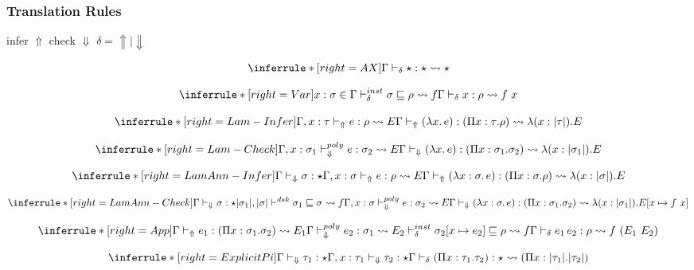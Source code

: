 \gram{\ottE\ottinterrule}

\subsubsection{Translation Rules}

 infer $\Uparrow$ check $\Downarrow$ $\delta = \Uparrow \mid \Downarrow$

\[
\inferrule*[right=AX]
{} {\infercheck \star : \star \transto{\star}}
\]

\[
\inferrule*[right=Var]
{x:\sigma \in \Gamma \\ \instinfercheck \sigma \sqsubseteq \rho \transto{f} } {\infercheck x : \rho \transto{f\ x}}
\]

\[
\inferrule*[right=Lam-Infer]
{\Gamma,x: \tau \infertypeno e : \rho \transto{E} }
{\infertype (\lambda x.\, e) : (\Pi x: \tau. \rho) \transto {\lambda(x:\translated{\tau}). E}}
\]

\[
\inferrule*[right=Lam-Check]
{\Gamma,x: \sigma_1 \polycheckno e : \sigma_2 \transto{E}
} {\checktype (\lambda x.\, e) : (\Pi x: \sigma_1. \sigma_2) \transto{\lambda(x:\translated{\sigma_1}).E}}
\]

\[
\inferrule*[right=LamAnn-Infer]
{
\checktype \sigma:\star \\
\Gamma,x: \sigma \infertypeno e : \rho \transto{E}
} {\infertype (\lambda x:\sigma.\, e) : (\Pi x: \sigma. \rho) \transto{\lambda(x:\translated{\sigma}). E}}
\]

\[
\inferrule*[right=LamAnn-Check]
{
\checktype \sigma:\star \\
\translated{\sigma_1}, \translated{\sigma} \polymorphic \sigma_1 \sqsubseteq \sigma \transto{f} \\
\Gamma,x: \sigma \polycheckno e : \sigma_2 \transto{E} \\
}
{\checktype (\lambda x:\sigma.\, e) : (\Pi x: \sigma_1. \sigma_2) \transto{ \lambda(x:\translated{\sigma_1}). E[\tpmapsto \sigma x {f\ x}] }}
\]

\[
\inferrule*[right=App]
{\infertype e_1 : (\Pi x:\sigma_1. \sigma_2) \transto {E_1} \\
\polycheck e_2 : \sigma_1 \transto{E_2}\\
\instinfercheck \sigma_2 [\tpmapsto {\sigma_1} x e_2] \sqsubseteq \rho \transto{f}}
{\infercheck e_1\,e_2 : \rho \transto{f\ (E_1\ E_2)}}
\]

\[
\inferrule*[right=ExplicitPi]
{\checktype \tau_1 : \star \\ \Gamma, x:\tau_1 \checktypeno \tau_2 : \star }
{\infercheck (\Pi x:\tau_1. \tau_2) : \star \transto{(\Pi x:\translated{\tau_1}. \translated{\tau_2})}}
\]

